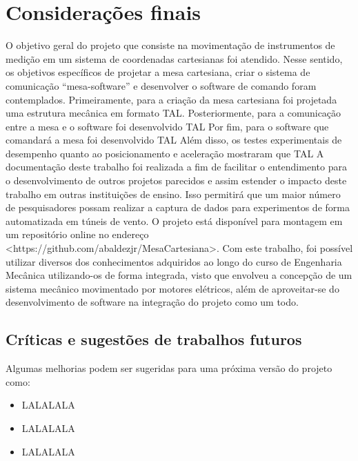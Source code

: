 \chapter{Considerações finais}
\label{chap:conclusao}

O objetivo geral do projeto que consiste na movimentação de instrumentos de medição em um sistema 
de coordenadas cartesianas foi atendido. Nesse sentido, os objetivos específicos de projetar a mesa cartesiana, criar o sistema de comunicação “mesa-software” e desenvolver o software de comando foram contemplados.
Primeiramente, para a criação da mesa cartesiana foi projetada uma estrutura mecânica em formato TAL.
Posteriormente, para a comunicação entre a mesa e o software foi desenvolvido TAL
Por fim, para o software que comandará a mesa foi desenvolvido TAL
Além disso, os testes experimentais de desempenho quanto ao posicionamento e aceleração mostraram que TAL
A documentação deste trabalho foi realizada a fim de facilitar o entendimento para o desenvolvimento de 
outros projetos parecidos e assim estender o impacto deste trabalho em outras instituições de ensino. 
Isso permitirá que um maior número de pesquisadores possam realizar a captura de dados para experimentos 
de forma automatizada em túneis de vento. O projeto está disponível para montagem em um repositório online 
no endereço <https://github.com/abaldezjr/MesaCartesiana>.
Com este trabalho, foi possível utilizar diversos dos conhecimentos adquiridos ao longo do curso de 
Engenharia Mecânica utilizando-os de forma integrada, visto que envolveu a concepção de um sistema 
mecânico movimentado por motores elétricos, além de aproveitar-se do desenvolvimento de software 
na integração do projeto como um todo.

\section{Críticas e sugestões de trabalhos futuros}

Algumas melhorias podem ser sugeridas para uma próxima versão do projeto como:

\begin{itemize}
    \item LALALALA
    \item LALALALA
    \item LALALALA
\end{itemize}